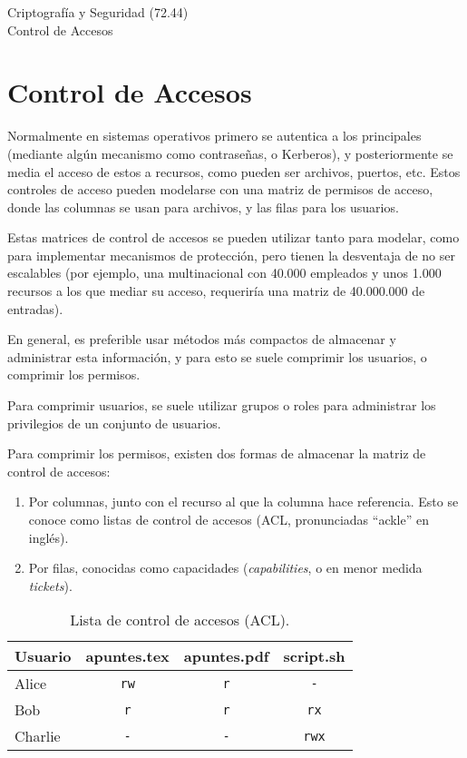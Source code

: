 \documentclass{article}
\theoremstyle{definition}
\begin{document}
\begin{center}
\Large Criptografía y Seguridad (72.44)\\[.05cm]
Control de Accesos \\[.05cm]
\the\year
\end{center}

\vspace{0.2 cm}
\section{Control de Accesos}
Normalmente en sistemas operativos primero se autentica a los principales
(mediante algún mecanismo como contraseñas, o Kerberos), y posteriormente se
media el acceso de estos a recursos, como pueden ser archivos, puertos, etc.
Estos controles de acceso pueden modelarse con una matriz de permisos de acceso,
donde las columnas se usan para archivos, y las filas para los usuarios.

Estas matrices de control de accesos se pueden utilizar tanto para modelar, como
para implementar mecanismos de protección, pero tienen la desventaja de no ser
escalables (por ejemplo, una multinacional con 40.000 empleados y unos 1.000 recursos
a los que mediar su acceso, requeriría una matriz de 40.000.000 de entradas). 

En general, es preferible usar métodos más compactos de almacenar y administrar
esta información, y para esto se suele comprimir los usuarios, o comprimir los
permisos.

Para comprimir usuarios, se suele utilizar grupos o roles para administrar los
privilegios de un conjunto de usuarios.

Para comprimir los permisos, existen dos formas de almacenar la matriz
de control de accesos:
\begin{enumerate}
  \item Por columnas, junto con el recurso al que la columna hace referencia.
    Esto se conoce como listas de control de accesos (ACL, pronunciadas
    ``ackle'' en inglés).
  \item Por filas, conocidas como capacidades (\textit{capabilities}, o en menor
    medida \textit{tickets}).
\end{enumerate}

\begin{table}[h!]
  \centering
\begin{tabular}{l|c|c|c} 
 Usuario & apuntes.tex & apuntes.pdf & script.sh \\ 
 \hline
 Alice   & \verb+rw+   & \verb+r+    & \verb+-+ \\ 
 Bob     & \verb+r+    & \verb+r+    & \verb+rx+ \\ 
 Charlie & \verb+-+    & \verb+-+    & \verb+rwx+ \\
\end{tabular}
\caption{Lista de control de accesos (ACL).}
\end{table}
\end{document}
